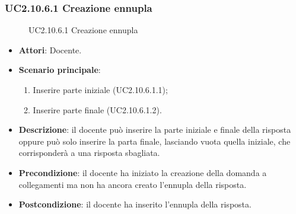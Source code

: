 \subsubsection{UC2.10.6.1 Creazione ennupla}
\begin{figure}[H]
\centering
\noindent{}
\caption{UC2.10.6.1 Creazione ennupla}
\end{figure}
\begin{itemize}
\item \textbf{Attori}: Docente.
\item \textbf{Scenario principale}:
\begin{enumerate}
\item Inserire parte iniziale (UC2.10.6.1.1);
\item Inserire parte finale (UC2.10.6.1.2).
\end{enumerate}
\item \textbf{Descrizione}: il docente può inserire la parte iniziale e finale della risposta oppure può solo inserire la parta finale, lasciando vuota quella iniziale, che corrisponderà a una risposta sbagliata.
\item \textbf{Precondizione}: il docente ha iniziato la creazione della domanda a collegamenti ma non ha ancora creato l'ennupla della risposta.
\item \textbf{Postcondizione}: il docente ha inserito l'ennupla della risposta.
\end{itemize}
